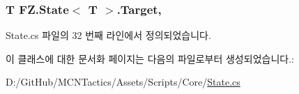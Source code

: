 \subsubsection[{\texorpdfstring{Target}{Target}}]{\setlength{\rightskip}{0pt plus 5cm}T {\bf F\+Z.\+State}$<$ T $>$.Target\hspace{0.3cm}{\ttfamily [get]}, {\ttfamily [protected]}}\hypertarget{class_f_z_1_1_state_a6927f5c9f2517052f9dc5596188e9d95}{}\label{class_f_z_1_1_state_a6927f5c9f2517052f9dc5596188e9d95}


State.\+cs 파일의 32 번째 라인에서 정의되었습니다.



이 클래스에 대한 문서화 페이지는 다음의 파일로부터 생성되었습니다.\+:\begin{DoxyCompactItemize}
\item 
D\+:/\+Git\+Hub/\+M\+C\+N\+Tactics/\+Assets/\+Scripts/\+Core/\hyperlink{_state_8cs}{State.\+cs}\end{DoxyCompactItemize}
